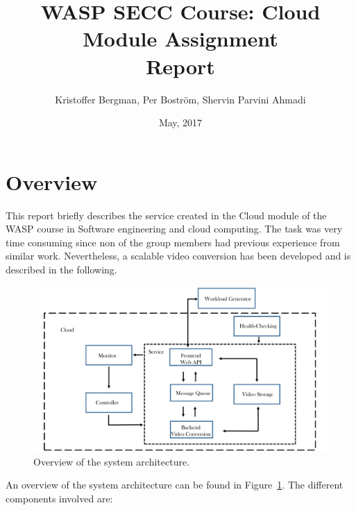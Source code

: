 \documentclass[a4paper, 10pt, english]{article}
\title{WASP SECC Course: Cloud Module Assignment\\Report}
\author{Kristoffer Bergman, Per Boström, Shervin Parvini Ahmadi}
\date{May, 2017}
\begin{document}
\maketitle

\section{Overview}
This report briefly describes the service created in the Cloud module of the WASP course in Software engineering and cloud computing. 
The task was very time consuming since non of the group members had previous experience from similar work. Nevertheless, a scalable video conversion has been developed and is described in the following.

\begin{figure}
	\label{fig:architecture}
	\centering
	\includegraphics[width=1\textwidth]{figs/workflow-final.pdf}
	\caption{Overview of the system architecture.}
\end{figure}
An overview of the system architecture can be found in Figure~\ref{fig:architecture}. The different components involved are:
\end{document}
